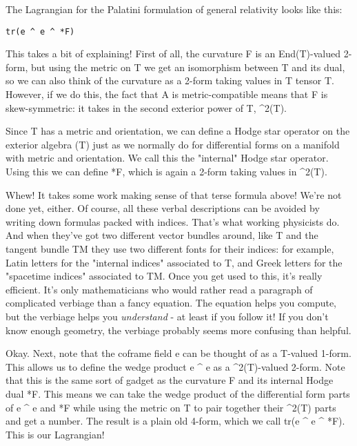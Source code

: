 The Lagrangian for the Palatini formulation of general relativity
looks like this:

\begin{verbatim}
tr(e ^ e ^ *F)
\end{verbatim}
    
This takes a bit of explaining!  First of all, the curvature F is an
End(T)-valued 2-form, but using the metric on T we get an isomorphism
between T and its dual, so we can also think of the curvature as a
2-form taking values in T tensor T.  However, if we do this, the fact
that A is metric-compatible means that F is skew-symmetric: it takes in
the second exterior power of T, \Lambda ^{2}(T).  

Since T has a metric and orientation, we can define a Hodge star
operator on the exterior algebra \Lambda (T) just as we normally do for
differential forms on a manifold with metric and orientation.  We call
this the "internal" Hodge star operator.  Using this we can 
define *F, which is again a 2-form taking values in \Lambda ^{2}(T).  

Whew!  It takes some work making sense of that terse formula above!
We're not done yet, either.  Of course, all these verbal descriptions
can be avoided by writing down formulas packed with indices. That's what
working physicists do.  And when they've got  two different vector
bundles around, like T and the tangent bundle TM they use two different
fonts for their indices: for example, Latin letters for the "internal
indices" associated to T, and Greek letters for the "spacetime indices"
associated to TM.  Once you get used to this, it's really efficient. 
It's only mathematicians who would rather read a paragraph of
complicated verbiage than a fancy equation.  The equation helps you
compute, but the verbiage helps you \emph{understand} - at least if you
follow it!  If you don't know enough geometry, the verbiage probably
seems more confusing than helpful.

Okay.  Next, note that the coframe field e can be thought of as a
T-valued 1-form.  This allows us to define the wedge product e ^ e as  
a \Lambda ^{2}(T)-valued 2-form.  Note that this is the same sort 
of gadget as the curvature F and its internal Hodge dual *F.  This means we can
take the wedge product of the differential form parts of e ^ e and *F
while  using the metric on T to pair together their \Lambda ^{2}(T) 
parts and get a number.  The result is a plain old 4-form, which we call 
tr(e ^ e ^ *F). This is our Lagrangian!

